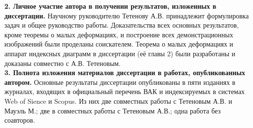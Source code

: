 \documentclass[14pt, a4paper]{extarticle}
\begin{document}
\quad

{\bf 2. Личное участие автора в получении результатов, изложенных в диссертации.}
Научному руководителю Тетенову А.В. принадлежит формулировка задач и общее руководство работы.
Доказательства всех основных результатов, кроме теоремы о малых деформациях, и построение всех демонстрационных изображений были проделаны соискателем.
Теорема о малых деформациях и аппарат индексных диаграмм в диссертации (её главы 2) были разработаны и доказаны совместно с А.В. Тетеновым.\\

{\bf 3. Полнота изложения материалов диссертации в работах, опубликованных автором.}
Основные результаты диссертации опубликованы в пяти изданиях в журналах, входящих в официальный перечень ВАК и индексируемых в системах Web of Sience и Scopus.
Из них две совместных работы  с Тетеновым А.В. и Мауэль М.; две в совместных работы с Тетеновым А.В.; одна работа без соавторов.

\end{document}
